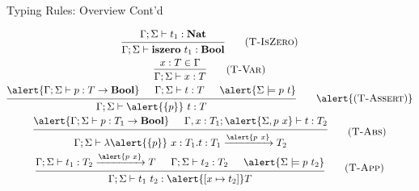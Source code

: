 \documentclass[handout]{beamer}
\begin{document}
\begin{frame}{Typing Rules: Overview Cont'd}

\begin{gather*}
    {\begin{prooftree}
        \hypo{ \Gamma;\Sigma \vdash t_1 : \textbf{Nat} }
        \infer1{ \Gamma;\Sigma \vdash \textbf{iszero} \ t_1 : \textbf{Bool} }
    \end{prooftree}} \tag{\textsc{T-IsZero}} \\
    {\begin{prooftree}
        \hypo{ x:T \in \Gamma }
        \infer1{ \Gamma;\Sigma \vdash x : T }
    \end{prooftree}} \tag{\textsc{T-Var}} \\
    {\begin{prooftree}
        \hypo{ \alert{\Gamma;\Sigma \vdash p : T \to \textbf{Bool}} }
        \hypo{ \Gamma;\Sigma \vdash t : T }
        \hypo{ \alert{\Sigma \models p \ t} }
        \infer3{ \Gamma;\Sigma \vdash \alert{\qty{p}} \ t : T }
    \end{prooftree}} \tag*{\alert{(\textsc{T-Assert})}} \\
    {\begin{prooftree}
        \hypo{ \alert{\Gamma;\Sigma \vdash p : T_1 \to \textbf{Bool}} }
        \hypo{ \Gamma, x:T_1;\alert{\Sigma,p \ x} \vdash t : T_2 }
        \infer2{ \Gamma;\Sigma \vdash \lambda \alert{\qty{p}} \ x : T_1 . t : T_1 \xrightarrow{\alert{p \ x}} T_2 }
    \end{prooftree}} \tag{\textsc{T-Abs}} \\
    {\begin{prooftree}
        \hypo{ \Gamma;\Sigma \vdash t_1 : T_2 \xrightarrow{\alert{p \ x}} T }
        \hypo{ \Gamma;\Sigma \vdash t_2 : T_2 }
        \hypo{ \alert{\Sigma \models p \ t_2} }
        \infer3{ \Gamma;\Sigma \vdash t_1 \ t_2 : \alert{[x \mapsto t_2]}T }
    \end{prooftree}} \tag{\textsc{T-App}}
\end{gather*}

\end{frame}
\end{document}
